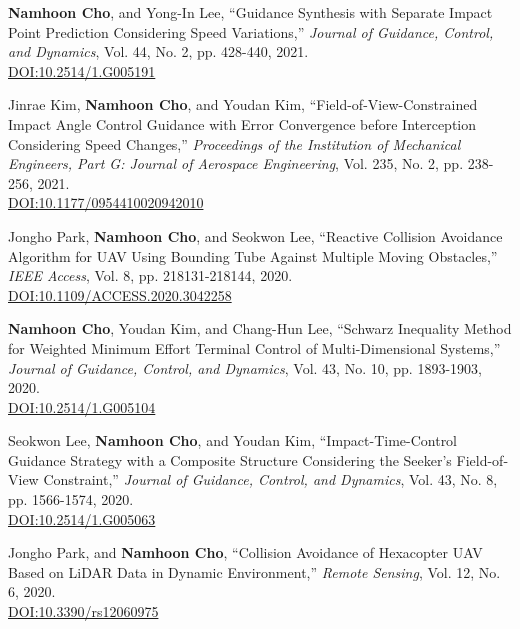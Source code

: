 \begin{enumerate}[itemsep=0.5em, label={[}J\arabic*{]}]
\item \textbf{Namhoon Cho}, and Yong-In Lee, ``Guidance Synthesis with Separate Impact Point Prediction Considering Speed Variations,'' \textit{Journal of Guidance, Control, and Dynamics}, Vol. 44, No. 2, pp. 428-440, 2021. \\
 \href{https://doi.org/10.2514/1.G005191}{DOI:10.2514/1.G005191}

\item Jinrae Kim, \textbf{Namhoon Cho}, and Youdan Kim, ``Field-of-View-Constrained Impact Angle Control Guidance with Error Convergence before Interception Considering Speed Changes,'' \textit{Proceedings of the Institution of Mechanical Engineers, Part G: Journal of Aerospace Engineering}, Vol. 235, No. 2, pp. 238-256, 2021. \\
 \href{https://doi.org/10.1177/0954410020942010}{DOI:10.1177/0954410020942010}

\item Jongho Park, \textbf{Namhoon Cho}, and Seokwon Lee, ``Reactive Collision Avoidance Algorithm for UAV Using Bounding Tube Against Multiple Moving Obstacles,'' \textit{IEEE Access}, Vol. 8, pp. 218131-218144, 2020. \\
 \href{https://doi.org/10.1109/ACCESS.2020.3042258}{DOI:10.1109/ACCESS.2020.3042258}

\item \textbf{Namhoon Cho}, Youdan Kim, and Chang-Hun Lee, ``Schwarz Inequality Method for Weighted Minimum Effort Terminal Control of Multi-Dimensional Systems,'' \textit{Journal of Guidance, Control, and Dynamics}, Vol. 43, No. 10, pp. 1893-1903, 2020. \\
 \href{https://doi.org/10.2514/1.G005104}{DOI:10.2514/1.G005104}

\item Seokwon Lee, \textbf{Namhoon Cho}, and Youdan Kim, ``Impact-Time-Control Guidance Strategy with a Composite Structure Considering the Seeker's Field-of-View Constraint,'' \textit{Journal of Guidance, Control, and Dynamics}, Vol. 43, No. 8, pp. 1566-1574, 2020. \\
 \href{https://doi.org/10.2514/1.G005063}{DOI:10.2514/1.G005063}

\item Jongho Park, and \textbf{Namhoon Cho}, ``Collision Avoidance of Hexacopter UAV Based on LiDAR Data in Dynamic Environment,'' \textit{Remote Sensing}, Vol. 12, No. 6, 2020. \\
 \href{https://doi.org/10.3390/rs12060975}{DOI:10.3390/rs12060975}


\end{enumerate}
